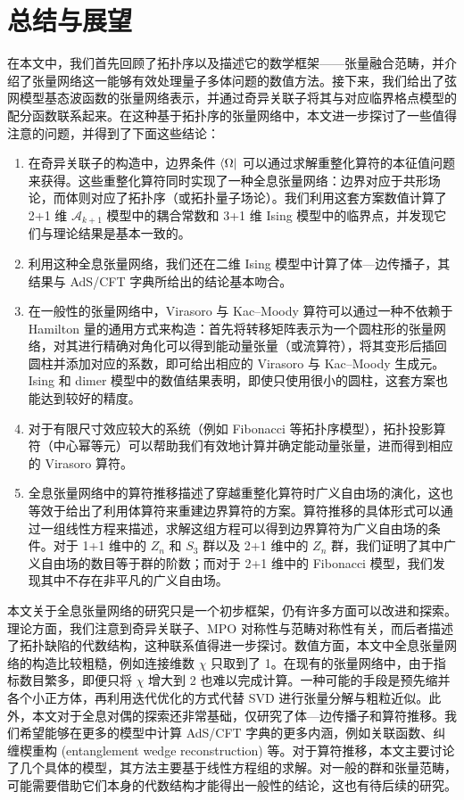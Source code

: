 \chapter{总结与展望}
\label{chap:conclusion}

在本文中，我们首先回顾了拓扑序以及描述它的数学框架——张量融合范畴，并介绍了张量网络这一能够有效处理量子多体问题的数值方法。接下来，我们给出了弦网模型基态波函数的张量网络表示，并通过奇异关联子将其与对应临界格点模型的配分函数联系起来。在这种基于拓扑序的张量网络中，本文进一步探讨了一些值得注意的问题，并得到了下面这些结论：

\begin{enumerate}
  \item 在奇异关联子的构造中，边界条件 $\bra{\Omega}$ 可以通过求解重整化算符的本征值问题来获得。这些重整化算符同时实现了一种全息张量网络：边界对应于共形场论，而体则对应了拓扑序（或拓扑量子场论）。我们利用这套方案数值计算了 2+1 维 $\mathcal{A}_{k+1}$ 模型中的耦合常数和 3+1 维 Ising 模型中的临界点，并发现它们与理论结果是基本一致的。
  \item 利用这种全息张量网络，我们还在二维 Ising 模型中计算了体—边传播子，其结果与 AdS/CFT 字典所给出的结论基本吻合。
  \item 在一般性的张量网络中，Virasoro 与 Kac--Moody 算符可以通过一种不依赖于 Hamilton 量的通用方式来构造：首先将转移矩阵表示为一个圆柱形的张量网络，对其进行精确对角化可以得到能动量张量（或流算符），将其变形后插回圆柱并添加对应的系数，即可给出相应的 Virasoro 与 Kac--Moody 生成元。Ising 和 dimer 模型中的数值结果表明，即使只使用很小的圆柱，这套方案也能达到较好的精度。
  \item 对于有限尺寸效应较大的系统（例如 Fibonacci 等拓扑序模型），拓扑投影算符（中心幂等元）可以帮助我们有效地计算并确定能动量张量，进而得到相应的 Virasoro 算符。
  \item 全息张量网络中的算符推移描述了穿越重整化算符时广义自由场的演化，这也等效于给出了利用体算符来重建边界算符的方案。算符推移的具体形式可以通过一组线性方程来描述，求解这组方程可以得到边界算符为广义自由场的条件。对于 1+1 维中的 $Z_n$ 和 $S_3$ 群以及 2+1 维中的 $Z_n$ 群，我们证明了其中广义自由场的数目等于群的阶数；而对于 2+1 维中的 Fibonacci 模型，我们发现其中不存在非平凡的广义自由场。
\end{enumerate}

本文关于全息张量网络的研究只是一个初步框架，仍有许多方面可以改进和探索。理论方面，我们注意到奇异关联子、MPO 对称性与范畴对称性\cite{ji2020categorical,kong2020algebraic,wu2021categorical,lootens2023dualities}\allowbreak 有关，而后者描述了拓扑缺陷的代数结构，这种联系值得进一步探讨。数值方面，本文中全息张量网络的构造比较粗糙，例如连接维数 $\chi$ 只取到了 1。在现有的张量网络中，由于指标数目繁多，即便只将 $\chi$ 增大到 2 也难以完成计算。一种可能的手段是预先缩并各个小正方体，再利用迭代优化的方式代替 SVD 进行张量分解与粗粒近似。此外，本文对于全息对偶的探索还非常基础，仅研究了体—边传播子和算符推移。我们希望能够在更多的模型中计算 AdS/CFT 字典的更多内涵，例如关联函数、纠缠楔重构 (entanglement wedge reconstruction) 等。对于算符推移，本文主要讨论了几个具体的模型，其方法主要基于线性方程组的求解。对一般的群和张量范畴，可能需要借助它们本身的代数结构才能得出一般性的结论，这也有待后续的研究。

